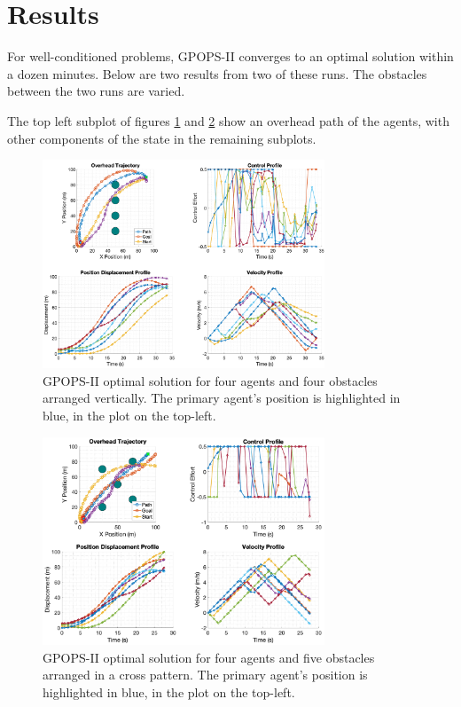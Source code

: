 \documentclass[conference]{IEEEtran}
\begin{document}
\section{Results}
For well-conditioned problems, GPOPS-II converges to an optimal solution within a dozen minutes. Below are two results from two of these runs. The obstacles between the two runs are varied.

The top left subplot of figures \ref{results_1} and \ref{results_2} show an overhead path of the agents, with other components of the state in the remaining subplots.

\begin{figure}[h!]
\begin{center}\includegraphics[width=0.75\textwidth]{img/results_1.png}
\caption{GPOPS-II optimal solution for four agents and four obstacles arranged vertically. The primary agent's position is highlighted in blue, in the plot on the top-left.}
\label{results_1}
\end{center}
\end{figure}

\begin{figure}[h!]
\begin{center}\includegraphics[width=0.75\textwidth]{img/results_2.png}
\caption{GPOPS-II optimal solution for four agents and five obstacles arranged in a cross pattern. The primary agent's position is highlighted in blue, in the plot on the top-left.}
\label{results_2}
\end{center}
\end{figure}
\end{document}
